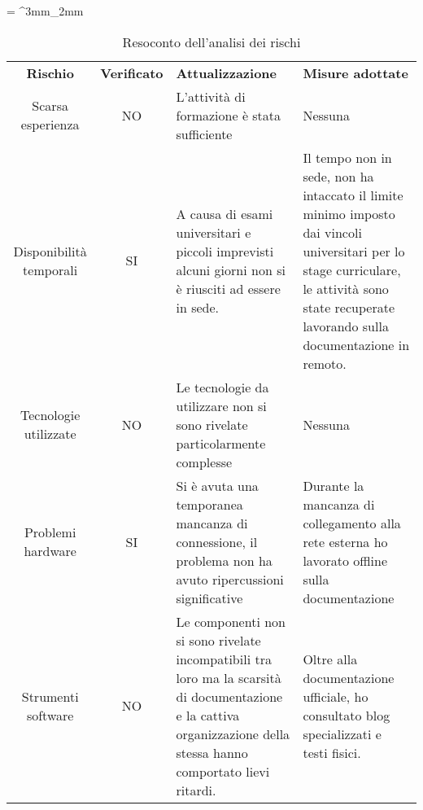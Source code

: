 \tabulinesep = ^3mm_2mm
\begin{longtabu} to \textwidth {ccXX}
    \caption[Resoconto dell'analisi dei rischi]{Resoconto dell'analisi dei rischi}
    \label{tab:rischi-final}
    \endlastfoot
    \rowfont{\bfseries\sffamily\leavevmode\color{white}}
    \textbf{Rischio} & \textbf{Verificato} & \textbf{Attualizzazione} & \textbf{Misure adottate} \\
    Scarsa esperienza & NO & L'attività di formazione è stata sufficiente & Nessuna\\ %
    Disponibilità temporali & SI & A causa di esami universitari e piccoli imprevisti alcuni giorni non si è riusciti ad essere in sede. & Il tempo non in sede, non ha intaccato il limite minimo imposto dai vincoli universitari per lo stage curriculare, le attività sono state recuperate lavorando sulla documentazione in remoto. \\ %
    Tecnologie utilizzate & NO & Le tecnologie da utilizzare non si sono rivelate particolarmente complesse & Nessuna\\ %
    Problemi hardware & SI & Si è avuta una temporanea mancanza di connessione, il problema non ha avuto ripercussioni significative & Durante la mancanza di collegamento alla rete esterna ho lavorato offline sulla documentazione \\ %
    Strumenti software & NO & Le componenti non si sono rivelate incompatibili tra loro ma la scarsità di documentazione e la cattiva organizzazione della stessa hanno comportato lievi ritardi. & Oltre alla documentazione ufficiale, ho consultato blog specializzati e testi fisici.\\ %
\end{longtabu}
